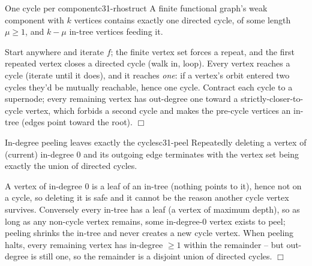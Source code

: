 \begin{theorem}{One cycle per component}{c31-rhostruct}
A finite functional graph's weak component with \(k\) vertices contains exactly one
directed cycle, of some length \(\mu\ge1\), and \(k-\mu\) in-tree vertices feeding it.
\end{theorem}

\begin{proofbox}
Start anywhere and iterate \(f\); the finite vertex set forces a repeat, and the
first repeated vertex closes a directed cycle (walk in, loop).  Every vertex reaches
a cycle (iterate until it does), and it reaches \emph{one}: if a vertex's orbit
entered two cycles they'd be mutually reachable, hence one cycle.  Contract each
cycle to a supernode; every remaining vertex has out-degree one toward a
strictly-closer-to-cycle vertex, which forbids a second cycle and makes the
pre-cycle vertices an in-tree (edges point toward the root). \(\Box\)
\end{proofbox}

\begin{lemma}{In-degree peeling leaves exactly the cycles}{c31-peel}
Repeatedly deleting a vertex of (current) in-degree \(0\) and its outgoing edge
terminates with the vertex set being exactly the union of directed cycles.
\end{lemma}

\begin{proofbox}
A vertex of in-degree \(0\) is a leaf of an in-tree (nothing points to it), hence not
on a cycle, so deleting it is safe and it cannot be the reason another cycle vertex
survives.  Conversely every in-tree has a leaf (a vertex of maximum depth), so as long
as any non-cycle vertex remains, some in-degree-\(0\) vertex exists to peel; peeling
shrinks the in-tree and never creates a new cycle vertex.  When peeling halts, every
remaining vertex has in-degree \(\ge1\) within the remainder -- but out-degree is still
one, so the remainder is a disjoint union of directed cycles. \(\Box\)
\end{proofbox}


